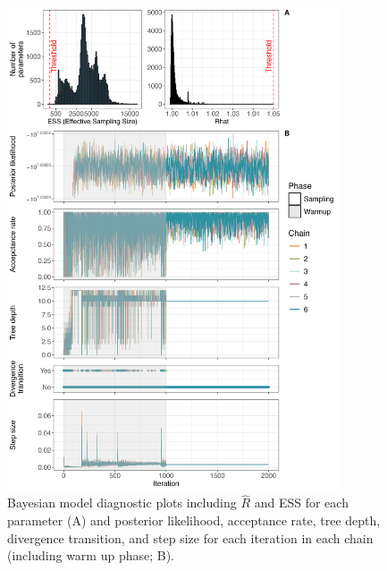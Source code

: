 \documentclass{article}
\begin{document}
\begin{figure}
\centering
\includegraphics[width=0.88\textwidth]{plots/11_Diagnostic_Fig_1.jpg}
\caption{Bayesian model diagnostic plots including $\hat{R}$ and ESS for each parameter (A) and posterior likelihood, acceptance rate, tree depth, divergence transition, and step size for each iteration in each chain (including warm up phase; B).}
\label{tab:diagnostics}
\end{figure}
\end{document}
